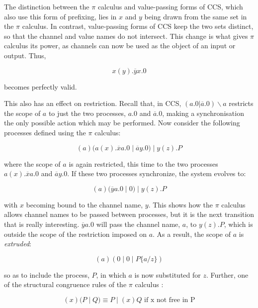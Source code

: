 The distinction between the $\pi$ calculus and value-passing forms of
CCS, which also use this form of prefixing, lies in $x$ and $y$ being
drawn from the same set in the $\pi$ calculus.  In contrast,
value-passing forms of CCS keep the two sets distinct, so that the
channel and value names do not intersect.  This change is what
gives $\pi$ calculus its power, as channels can now be used as the
object of an input or output.  Thus,

\begin{equation}
x(y).\overline{y}x.0
\end{equation}

\noindent becomes perfectly valid.

This also has an effect on restriction.  Recall that, in CCS,
$(a.0|\overline{a}.0)\backslash a$ restricts the scope of $a$ to just
the two processes, $a.0$ and $\overline{a}.0$, making a synchronisation
the only possible action which may be performed.  Now consider the
following processes defined using the $\pi$ calculus:

\begin{equation}
(a)(a(x).\overline{x}a.0\;|\;\overline{a}y.0)\;|\;y(z).P
\end{equation}

\noindent where the scope of $a$ is again restricted, this time to the
two processes $a(x).\overline{x}a.0$ and $\overline{a}y.0$.  If these
two processes synchronize, the system evolves to:

\begin{equation}
(a)(\overline{y}a.0\;|\;0)\;|\;y(z).P
\end{equation}

\noindent with $x$ becoming bound to the channel name, $y$.  This shows
how the $\pi$ calculus allows channel names to be passed between
processes, but it is the next transition that is really interesting.
$\overline{y}a.0$ will pass the channel name, $a$, to $y(z).P$, which is
outside the scope of the restriction imposed on $a$.  As a result, the
scope of $a$ is \emph{extruded}:

\begin{equation}
(a)(0\;|\;0\;|\;P\{a/z\})
\end{equation}

\noindent so as to include the process, $P$, in which $a$ is now
substituted for $z$.  Further, one of the structural congruence rules of
the $\pi$ calculus \cite{funcproc}:

\begin{equation}
(x)(P\;|\;Q) \equiv P\;|\;(x)Q\text{ if x not free in P}
\end{equation}

